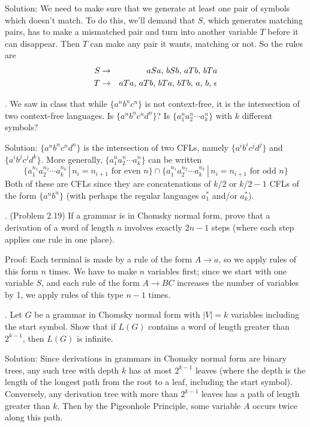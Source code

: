 \documentclass[12pt]{article}
\begin{document}
Solution: We need to make sure that we generate at least one pair of symbols which doesn't match.  To do this, we'll demand that $S$, which generates matching pairs, has to make a mismatched pair and turn into another variable $T$ before it can disappear.  Then $T$ can make any pair it wants, matching or not.  So the rules are
\begin{eqnarray*}
S & \to & aSa, \,bSb, \,aTb, \, bTa \\
T & \to & aTa, \,aTb, \,bTa, \,bTb, \,a, \,b, \,\epsilon
\end{eqnarray*}

\medskip
{}. We saw in class that while $\{ a^n b^n c^n \}$ is not context-free, it is the intersection of two context-free languages.  Is $\{ a^n b^n c^n d^n \}$?  Is $\{ a_1^n a_2^n \cdots a_k^n \}$ with $k$ different symbols?

Solution: $\{ a^n b^n c^n d^n \}$ is the intersection of two CFLs, namely $\{ a^i b^i c^j d^j \}$ and $\{ a^i b^j c^j d^k \}$.  More generally, $\{ a_1^n a_2^n \cdots a_k^n \}$ can be written
\[ \{ a_1^{n_1} a_2^{n_2} \cdots a_k^{n_k} \,|\, n_i = n_{i+1} \mbox{ for even } n \} \cap
\{ a_1^{n_1} a_2^{n_2} \cdots a_k^{n_k} \,|\, n_i = n_{i+1} \mbox{ for odd } n \} \]
Both of these are CFLs since they are concatenations of $k/2$ or $k/2 - 1$ CFLs of the form $\{ a^n b^n \}$ (with perhaps the regular languages $a_1^*$ and/or $a_k^*$).

\newpage
{}. (Problem 2.19) If a grammar is in Chomsky normal form, prove that a derivation of a word of length $n$ involves exactly $2n-1$ steps (where each step applies one rule in one place).

Proof: Each terminal is made by a rule of the form $A \to a$, so we apply rules of this form $n$ times.  We have to make $n$ variables first; since we start with one variable $S$, and each rule of the form $A \to BC$ increases the number of variables by 1, we apply rules of this type $n-1$ times.

\medskip
{}. Let $G$ be a grammar in Chomsky normal form with $|V|=k$ variables including the start symbol.  Show that if $L(G)$ contains a word of length greater than $2^{k-1}$, then $L(G)$ is infinite.

Solution: Since derivations in grammars in Chomsky normal form are binary trees, any such tree with depth $k$ has at most $2^{k-1}$ leaves (where the depth is the length of the longest path from the root to a leaf, including the start symbol).  Conversely, any derivation tree with more than $2^{k-1}$ leaves has a path of length greater than $k$.  Then by the Pigeonhole Principle, some variable $A$ occurs twice along this path.
\end{document}

